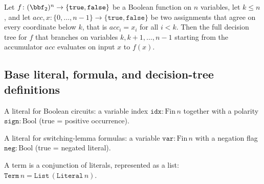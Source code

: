 \begin{lemma}
\label{DecisionTree.buildFull_eval}
\leanok
{}
Let $f \colon (\bbf_2)^n \to \{\mathtt{true},\mathtt{false}\}$ be a Boolean function on
$n$ variables, let $k \le n$, and let $acc, x \colon \{0,\dots,n-1\} \to
\{\mathtt{true},\mathtt{false}\}$ be two assignments that agree on every coordinate
below $k$, that is $acc_i = x_i$ for all $i < k$. Then the full decision tree for $f$
that branches on variables $k, k+1, \dots, n-1$ starting from the accumulator $acc$
evaluates on input $x$ to $f(x)$.
\end{lemma}

\subsection{Base literal, formula, and decision-tree definitions}

\begin{definition}
\label{BoolCircuit.Lit}
\leanok
A literal for Boolean circuits: a variable index $\mathtt{idx} : \mathrm{Fin}\,n$
together with a polarity $\mathtt{sign} : \mathrm{Bool}$ (true = positive occurrence).
\end{definition}

\begin{definition}[Literal]
\label{Literal}
\leanok
A literal for switching-lemma formulas: a variable $\mathtt{var} : \mathrm{Fin}\,n$
with a negation flag $\mathtt{neg} : \mathrm{Bool}$ (true = negated literal).
\end{definition}

\begin{definition}[Term]
\label{Term}
\leanok
{}
A term is a conjunction of literals, represented as a list:
$\mathtt{Term}\,n = \mathtt{List}\,(\mathtt{Literal}\,n)$.
\end{definition}

